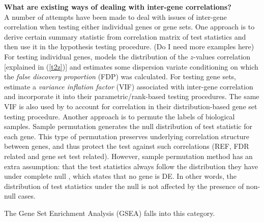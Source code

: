 \documentclass[12pt, a4paper]{article}
\begin{document}
	 \textbf{What are existing ways of dealing with inter-gene correlations?}\\
	 A number of attempts have been made to deal with issues of inter-gene correlation when testing either individual genes or gene sets. One approach is to derive certain summary statistic from correlation matrix of test statistics and then use it in the hypothesis testing procedure. (Do I need more examples here) For testing individual genes, \citet{efron2007correlation} models the distribution of the $z$-values correlation [explained in (\ref{t2z})] and estimates some dispersion variate conditioning on which the \textit{false discovery proportion} (FDP) was calculated. For testing gene sets, \citet{wu2012camera} estimate a \textit{variance inflation factor} (VIF) associated with inter-gene correlation and incorporate it into their parametric/rank-based testing procedures. The same VIF is also used by \citet{yaari2013quantitative} to account for correlation in their distribution-based gene set testing procedure. Another approach is to permute the labels of biological samples. Sample permutation generates the null distribution of test statistic for each gene.
	 This type of permutation preserves underlying correlation structure between genes, and thus protect the test against such correlations (REF, FDR related and gene set test related). However, sample permutation method has an extra assumption: that the test statistics always follow the distribution they have under complete null \cite{efron2012large1}, which states that no gene is DE. In other words, the distribution of test statistics under the null is not affected by the presence of non-null cases.
	 
	  The Gene Set Enrichment Analysis (GSEA) \citep{subramanian2005gene} falls into this category.
	 
\end{document}
